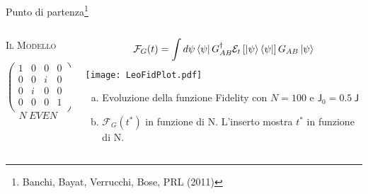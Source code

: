 \documentclass[xcolor=x11names,compress]{beamer}
\renewcommand{\(}{\begin{columns}}
\renewcommand{\)}{\end{columns}}
\newcommand{\<}[1]{\begin{column}{#1}}
\renewcommand{\>}{\end{column}}
\begin{document}
\begin{frame}{Punto di partenza\footnote{Banchi, Bayat, Verrucchi, Bose, PRL (2011)}}
\begin{columns}[c]
\begin{column}{0.6\textwidth}{\textsc{\textcolor{myNetworks}{Il Modello}}}
\begin{center}
\begin{minipage}{0.8\textwidth}
\begin{multicols}{2}
{$$
\begin{pmatrix}
1 & 0 & 0 & 0\\
	0 & 0 & i & 0\\
	0 & i & 0 & 0\\
	0 & 0 & 0 & 1\\
\end{pmatrix}
$$
$$
N\ EVEN
$$
}

\end{multicols}
\end{minipage}

\end{center}


\end{column}

\hspace{-20pt}
\vrule{}

\begin{column}{0.6\textwidth}
\scriptsize{\textcolor{redCWI}{
$$\mathcal{F}_G (t) = \int d \psi \left\langle \psi \right| G_{\tiny{AB}}^{\dag} \mathcal{E}_t \left[ \left| \psi \right\rangle \left\langle \psi \right| \right] G_{\tiny{AB}} \left| \psi \right\rangle$$}}
\texttt{[image: LeoFidPlot.pdf]}


\begin{enumerate}[(a)]
\item Evoluzione della funzione Fidelity con $N = 100$ e $\textsf{J}_0 = 0.5\ \textsf{J}$

\item $\mathcal{F}_G (t^*)$ in funzione di N. L'inserto mostra $t^*$ in funzione di N.
\end{enumerate}


\end{column}
\end{columns}


\end{frame}

\end{document}
